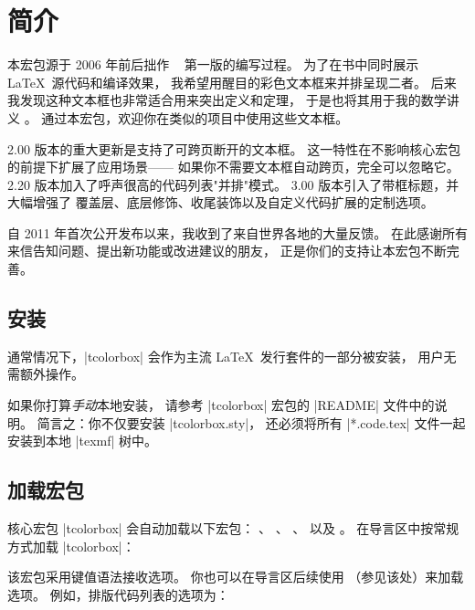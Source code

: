 \clearpage
\section{简介}%
%
本宏包源于 2006 年前后拙作
\flqq{}\frqq~\cite{sturm:latex}
第一版的编写过程。
为了在书中同时展示 \LaTeX\ 源代码和编译效果，
我希望用醒目的彩色文本框来并排呈现二者。
后来我发现这种文本框也非常适合用来突出定义和定理，
于是也将其用于我的数学讲义
\cite{sturm:mathe1,sturm:mathe2,sturm:mathe3}。
通过本宏包，欢迎你在类似的项目中使用这些文本框。

2.00 版本的重大更新是支持了可跨页断开的文本框。
这一特性在不影响核心宏包的前提下扩展了应用场景——
如果你不需要文本框自动跨页，完全可以忽略它。
2.20 版本加入了呼声很高的代码列表"并排"模式。
3.00 版本引入了带框标题，并大幅增强了
覆盖层、底层修饰、收尾装饰以及自定义代码扩展的定制选项。

\begin{tcolorbox}[enhanced,boxrule=0mm,boxsep=0mm,frame hidden,interior hidden,
  left=0mm,right=0mm,top=0mm,bottom=0mm,watermark opacity=0.25,watermark zoom=1.2,before=\par\smallskip,
  clip watermark=false,
  watermark tikz={%
    \path[fill=yellow,draw=yellow!75!red] (0,0) circle (1cm);
    \fill[red] (45:5mm) circle (1mm);
    \fill[red] (135:5mm) circle (1mm);
    \draw[line width=1mm,red] (215:5mm) arc (215:325:5mm);}]
自 2011 年首次公开发布以来，我收到了来自世界各地的大量反馈。
在此感谢所有来信告知问题、提出新功能或改进建议的朋友，
正是你们的支持让本宏包不断完善。
\end{tcolorbox}


\subsection{安装}
通常情况下，|tcolorbox| 会作为主流 \LaTeX\ 发行套件的一部分被安装，
用户无需额外操作。

如果你打算\emph{手动}本地安装，
请参考 |tcolorbox| 宏包的 |README| 文件中的说明。
简言之：你不仅要安装 |tcolorbox.sty|，
还必须将所有 |*.code.tex| 文件一起安装到本地 |texmf| 树中。


\subsection{加载宏包}
核心宏包 |tcolorbox| 会自动加载以下宏包：
 \cite{tantau:tikz_and_pgf}、
 \cite{schoepf:verbatim}、
 \cite{lehmann:etoolbox}、
以及  \cite{robertson:2014a}。
在导言区中按常规方式加载 |tcolorbox|：
\begin{dispListing}
\usepackage{tcolorbox}
\end{dispListing}
该宏包采用键值语法接收选项。
你也可以在导言区后续使用
（参见该处）来加载选项。
例如，排版代码列表的选项为：
\begin{dispListing}
\usepackage[listings]{tcolorbox}
\end{dispListing}


